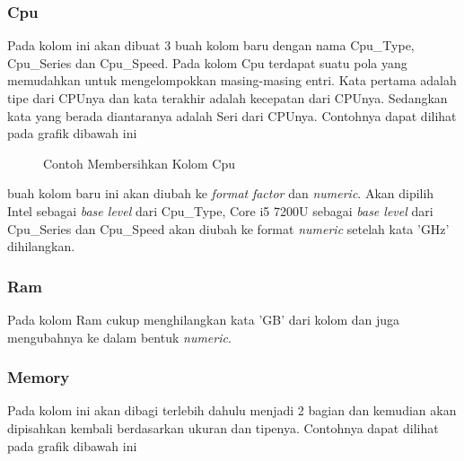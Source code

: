 \documentclass[12pt]{article}
\begin{document}
\subsubsection{Cpu}
Pada kolom ini akan dibuat 3 buah kolom baru dengan nama Cpu\_Type, Cpu\_Series dan Cpu\_Speed. Pada kolom Cpu terdapat suatu pola yang memudahkan untuk mengelompokkan masing-masing entri. Kata pertama adalah tipe dari CPUnya dan kata terakhir adalah kecepatan dari CPUnya. Sedangkan kata yang berada diantaranya adalah Seri dari CPUnya. Contohnya dapat dilihat pada grafik dibawah ini   
  
\begin{figure}[h!]
    \centering
    \caption{Contoh Membersihkan Kolom Cpu}
    \label{clean_cpu}
\end{figure}
  
 buah kolom baru ini akan diubah ke \textit{format} \textit{factor} dan \textit{numeric}. Akan dipilih Intel sebagai \textit{base level} dari Cpu\_Type, Core i5 7200U sebagai \textit{base level} dari Cpu\_Series dan Cpu\_Speed akan diubah ke format \textit{numeric} setelah kata 'GHz' dihilangkan.   
\subsubsection{Ram}
Pada kolom Ram cukup menghilangkan kata 'GB' dari kolom dan juga mengubahnya ke dalam bentuk \textit{numeric}. 
\subsubsection{Memory}
Pada kolom ini akan dibagi terlebih dahulu menjadi 2 bagian dan kemudian akan dipisahkan kembali berdasarkan ukuran dan tipenya. Contohnya dapat dilihat pada grafik dibawah ini
\end{document}
